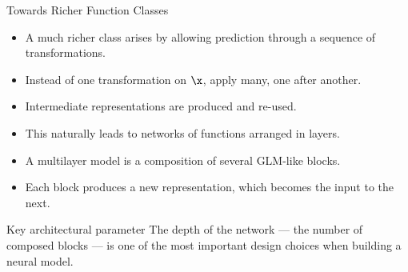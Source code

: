 \begin{frame}{Towards Richer Function Classes}
  \begin{itemize}
    \item A much richer class arises by allowing prediction through a \alert{sequence of transformations}.
    \item Instead of one transformation on $\x$, apply many, one after another.
    \item Intermediate representations are produced and re-used.
    \item This naturally leads to \alert{networks of functions arranged in layers}.
    \item A multilayer model is a \alert{composition of several GLM-like blocks}.
    \item Each block produces a new representation, which becomes the input to the next.
  \end{itemize}
  \begin{block}{Key architectural parameter}
    The \alert{depth} of the network — the number of composed blocks — is one of the most important
    design choices when building a neural model.
  \end{block}
\end{frame}


